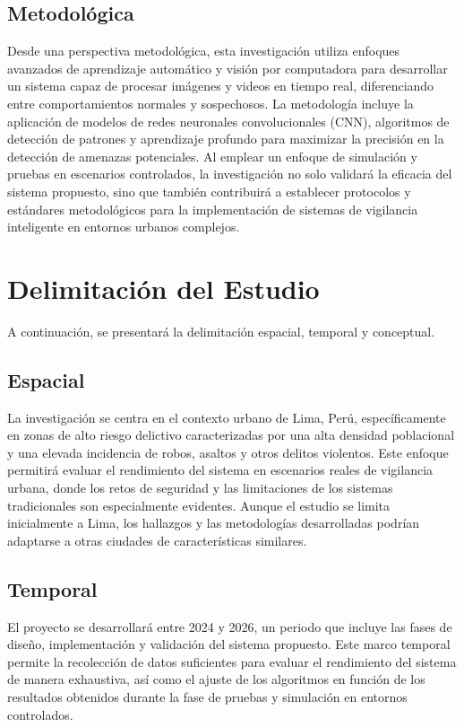 \subsection{Metodológica}
Desde una perspectiva metodológica, esta investigación utiliza enfoques avanzados de aprendizaje automático y visión por computadora para desarrollar un sistema capaz de procesar imágenes y videos en tiempo real, diferenciando entre comportamientos normales y sospechosos. La metodología incluye la aplicación de modelos de redes neuronales convolucionales (CNN), algoritmos de detección de patrones y aprendizaje profundo para maximizar la precisión en la detección de amenazas potenciales. Al emplear un enfoque de simulación y pruebas en escenarios controlados, la investigación no solo validará la eficacia del sistema propuesto, sino que también contribuirá a establecer protocolos y estándares metodológicos para la implementación de sistemas de vigilancia inteligente en entornos urbanos complejos.


\section{Delimitación del Estudio}
A continuación, se presentará la delimitación espacial, temporal y conceptual.

\subsection{Espacial}
La investigación se centra en el contexto urbano de Lima, Perú, específicamente en zonas de alto riesgo delictivo caracterizadas por una alta densidad poblacional y una elevada incidencia de robos, asaltos y otros delitos violentos. Este enfoque permitirá evaluar el rendimiento del sistema en escenarios reales de vigilancia urbana, donde los retos de seguridad y las limitaciones de los sistemas tradicionales son especialmente evidentes. Aunque el estudio se limita inicialmente a Lima, los hallazgos y las metodologías desarrolladas podrían adaptarse a otras ciudades de características similares.

\subsection{Temporal}
El proyecto se desarrollará entre 2024 y 2026, un periodo que incluye las fases de diseño, implementación y validación del sistema propuesto. Este marco temporal permite la recolección de datos suficientes para evaluar el rendimiento del sistema de manera exhaustiva, así como el ajuste de los algoritmos en función de los resultados obtenidos durante la fase de pruebas y simulación en entornos controlados.

